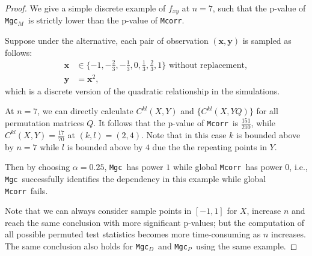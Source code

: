 \documentclass[11pt]{article}
\providecommand{\sct}[1]{{\sc \texttt{#1}}}
\providecommand{\mb}[1]{\boldsymbol{#1}}
\newcommand{\G}{C}
\newcommand{\Mgc}{\sct{Mgc}}
\newcommand{\Mgcp}{\sct{Mgc$_P$}}
\newcommand{\Mgcd}{\sct{Mgc$_D$}}
\newcommand{\Mgcm}{\sct{Mgc$_M$}}
\newcommand{\Mcorr}{\sct{Mcorr}}
\newcommand{\mbx}{\ensuremath{\mb{x}}}
\newcommand{\mby}{\ensuremath{\mb{y}}}
\newtheorem{appThm}{Theorem}
\begin{document}
\begin{proof}
We give a simple discrete example of $f_{xy}$ at $n=7$, such that the p-value of \Mgcm~is strictly lower than the p-value of \Mcorr.

Suppose under the alternative, each pair of observation $(\mbx,\mby)$ is sampled as follows:
\begin{align*}
\mbx &\in \{-1,-\frac{2}{3},-\frac{1}{3},0,\frac{1}{3},\frac{2}{3},1\} \mbox{ without replacement}, \\
\mby &= \mbx^2,
\end{align*}
which is a discrete version of the quadratic relationship in the simulations.

At $n=7$, we can directly calculate $\G^{kl}(X, Y)$ and $\{\G^{kl}(X, YQ)\}$ for all permutation matrices $Q$. It follows that the p-value of \Mcorr~is $\frac{151}{210}$, while $\G^{kl}(X, Y)=\frac{17}{70}$ at $(k,l)=(2,4)$. Note that in this case $k$ is bounded above by $n=7$ while $l$ is bounded above by $4$ due the the repeating points in $Y$.

Then by choosing $\alpha=0.25$, \Mgc~has power $1$ while global \Mcorr~has power $0$, i.e., \Mgc~successfully identifies the dependency in this example while global \Mcorr~fails.

Note that we can always consider sample points in $[-1,1]$ for $X$, increase $n$ and reach the same conclusion with more significant p-values; but the computation of all possible permuted test statistics becomes more time-consuming as $n$ increases. The same conclusion also holds for \Mgcd~and \Mgcp~using the same example.
\end{proof}






\end{document}

